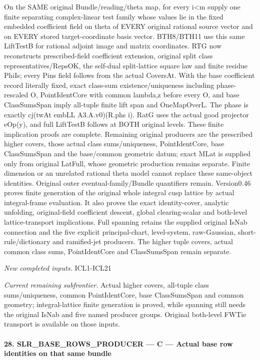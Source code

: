 \documentclass[11pt,a4paper]{article}
\numberwithin{equation}{section}
\theoremstyle{remark}\newtheorem{remark}[theorem]{Remark}
\begin{document}
On the SAME original Bundle/reading/theta map, for every i<m supply one finite separating complex-linear test family whose values lie in the fixed embedded coefficient field on theta of EVERY original rational source vector and on EVERY stored target-coordinate basis vector. BTH8/BTH11 use this same LiftTestB for rational adjoint image and matrix coordinates. RTG now reconstructs prescribed-field coefficient extension, original split class representatives/RepsOK, the self-dual split-lattice square law and finite residue PhiIs; every Pins field follows from the actual CoversAt. With the base coefficient record literally fixed, exact class-sum existence/uniqueness including phase-rescaled O, PointIdentCore with common lambda,z before every O, and base ClassSumsSpan imply all-tuple finite lift span and OneMapOverL. The phase is exactly cj(twAt embLL A3.A.v0)(R.phs i). RatG uses the actual good projector eOp(y), and full LiftTestB follows at BOTH original levels. These finite implication proofs are complete. Remaining original producers are the prescribed higher covers, those actual class sums/uniqueness, PointIdentCore, base ClassSumsSpan and the base/common geometric datum; exact MLat is supplied only from original LatFull, whose geometric production remains separate. Finite dimension or an unrelated rational theta model cannot replace these same-object identities. Original outer eventual-family/Bundle quantifiers remain. Version0.46 proves finite generation of the original whole integral cusp lattice by actual integral-frame evaluation. It also proves the exact identity-cover, analytic unfolding, original-field coefficient descent, global clearing-scalar and both-level lattice-transport implications. Full spanning retains the supplied original IsNab connection and the five explicit principal-chart, level-system, raw-Gaussian, short-rule/dictionary and ramified-jet producers. The higher tuple covers, actual common class sums, PointIdentCore and ClassSumsSpan remain separate.

\emph{New completed inputs.} ICL1-ICL21

\emph{Current remaining subfrontier.} Actual higher covers, all-tuple class sums/uniqueness, common PointIdentCore, base ClassSumsSpan and common geometry; integral-lattice finite generation is proved, while spanning still needs the original IsNab and five named producer groups. Original both-level FWTie transport is available on those inputs.



\paragraph{28. SLR\_\allowbreak BASE\_\allowbreak ROWS\_\allowbreak PRODUCER — C — Actual base row identities on that same bundle}
\end{document}

